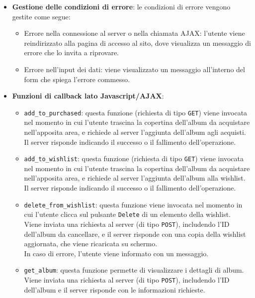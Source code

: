 \begin{itemize}
\begin{itemize}
        \end{itemize}
    \item \textbf{Gestione delle condizioni di errore}: le condizioni di errore vengono gestite come segue:
    	\begin{itemize}
    		\item Errore nella connessione al server o nella chiamata AJAX: l'utente viene reindirizzato alla pagina di accesso al sito, dove visualizza un messaggio di errore che lo invita a riprovare.
    		\item Errore nell'input dei dati: viene visualizzato un messaggio all'interno del form che spiega l'errore commesso.
    	\end{itemize}
    \item \textbf{Funzioni di callback lato Javascript/AJAX}:
        \begin{itemize}
            \item \texttt{add\_to\_purchased}: questa funzione (richiesta di tipo \texttt{GET}) viene invocata nel momento in cui l'utente trascina la copertina dell'album da acquistare nell'apposita area, e richiede al server l'aggiunta dell'album agli acquisti.\\
            Il server risponde indicando il successo o il fallimento dell'operazione.
            \item \texttt{add\_to\_wishlist}: questa funzione (richiesta di tipo \texttt{GET}) viene invocata nel momento in cui l'utente trascina la copertina dell'album da acquistare nell'apposita area, e richiede al server l'aggiunta dell'album alla wishlist.\\
            Il server risponde indicando il successo o il fallimento dell'operazione.
            \item \texttt{delete\_from\_wishlist}: questa funzione viene invocata nel momento in cui l'utente clicca sul pulsante \texttt{Delete} di un elemento della wishlist.\\
            Viene inviata una richiesta al server (di tipo \texttt{POST}), includendo l'ID dell'album da cancellare, e il server risponde con una copia della wishlist aggiornata, che viene ricaricata su schermo.\\
            In caso di errore, l'utente viene informato con un messaggio.
            \item \texttt{get\_album}: questa funzione permette di visualizzare i dettagli di album.\\
            Viene inviata una richiesta al server (di tipo \texttt{POST}), includendo l'ID dell'album e il server risponde con le informazioni richieste.\\

\end{itemize}
\end{itemize}
